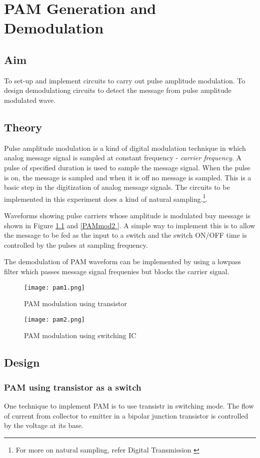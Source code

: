\chapter[PAM Generation and Demodulation]{PAM Generation and Demodulation}

\section*{Aim}
To set-up and implement circuits to carry out pulse amplitude modulation. To design demodulationg circuits to detect the message from pulse amplitude modulated wave.
\section*{Theory}
Pulse amplitude modulation is a kind of digital modulation technique in which analog message signal is sampled at constant frequency - \emph{carrier frequency}. A pulse of specified duration is used to sample the message signal. When the pulse is on, the message is sampled and when it is off no message is sampled. This is a basic step in the digitization of analog message signals. The circuits to be implemented in this experiment does a kind of natural sampling.\footnote{For more on natural sampling, refer Digital Transmission \cite{Tomasi}}.

Waveforms showing pulse carriers whose amplitude is modulated buy message is shown in Figure \ref{PAMmod1} and \ref{PAMmod2
}. A simple way to implement this is to allow the message to be fed as the input to a switch and the switch ON/OFF time is controlled by the pulses at sampling frequency.

The demodulation of PAM waveform can be implemented by using a lowpass filter which passes message signal frequenies but blocks the carrier signal.
\begin{figure}[h]
\texttt{[image: pam1.png]}
\caption{PAM modulation using transistor}
\label{PAMmod1}
\end{figure}

\begin{figure}[h]
\texttt{[image: pam2.png]}
\caption{PAM modulation using switching IC}
\label{PAMmod2}
\end{figure}
\section*{Design}
\subsection*{PAM using transistor as a switch}
One technique to implement PAM is to use transistr in switching mode. The flow of current from collector to emitter in a bipolar junction transistor is controlled by the voltage at its base. 


